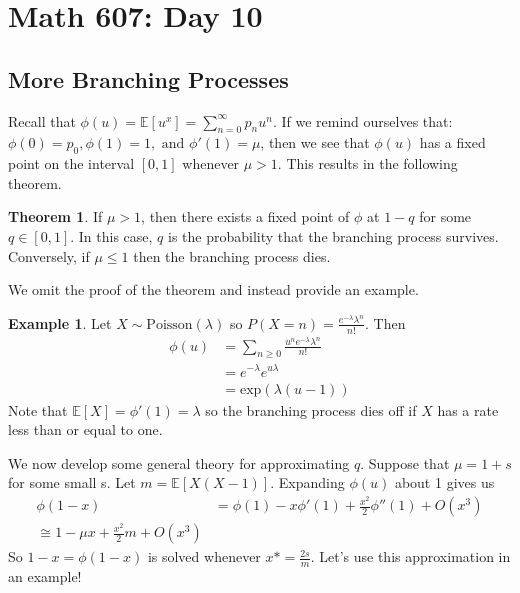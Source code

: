 \documentclass{article}
\theoremstyle{definition}
\newtheorem{example}{Example}
\newtheorem{theorem}{Theorem}
\begin{document}
\section{Math 607: Day 10}
\subsection{More Branching Processes}
Recall that $\phi(u) = \mathbb{E}[u^x] = \sum_{n=0}^{\infty}{p_nu^n}$. If we remind ourselves that: $\phi(0) = p_0, \phi(1) = 1, \text{ and } \phi'(1) = \mu$, then we see that $\phi(u)$ has a fixed point on the interval $[0,1]$ whenever $\mu > 1$. This results in the following theorem.

\begin{theorem} If $\mu > 1$, then there exists a fixed point of $\phi$ at $1 - q$ for some $q \in [0,1]$. In this case, $q$ is the probability that the branching process survives. Conversely, if $\mu \leq 1$ then the branching process dies. 
\end{theorem} 

We omit the proof of the theorem and instead provide an example. 

\begin{example} Let $X \sim \text{Poisson}(\lambda)$ so $P(X = n) = \frac{e^{-\lambda}\lambda^n}{n!}$. Then 
\begin{align*}
\phi(u) &= \sum_{n\geq 0}{\frac{u^ne^{-\lambda}\lambda^n}{n!}}\\
&= e^{-\lambda}e^{u\lambda} \\
&= \text{exp}(\lambda(u-1))
\end{align*}
Note that $\mathbb{E}[X] = \phi'(1) = \lambda$ so the branching process dies off if $X$ has a rate less than or equal to one. 
\end{example}

We now develop some general theory for approximating $q$. Suppose that $\mu = 1 + s$ for some small s. Let $m = \mathbb{E}[X(X-1)]$. Expanding $\phi(u)$ about 1 gives us
\begin{align*}
\phi(1-x) &= \phi(1) - x\phi'(1) + \frac{x^2}{2}\phi''(1) + O(x^3)\\
\cong 1 - \mu x + \frac{x^2}{2}m + O(x^3)
\end{align*}
So $1 - x = \phi(1-x)$ is solved whenever $x* = \frac{2s}{m}$. Let's use this approximation in an example! 
\end{document}
